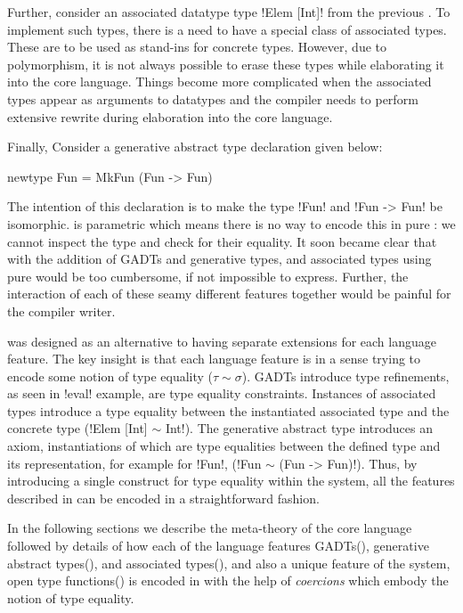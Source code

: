 \documentclass[screen,nonacm]{acmart}
\begin{document}
Further, consider an associated datatype type !Elem [Int]! from the previous . To implement such types, there is a need to have a special class of associated types. These are to be used as stand-ins for concrete types. However, due to polymorphism, it is not always possible to erase these types while elaborating it into the core language. Things become more complicated when the associated types appear as arguments to datatypes and the compiler needs to perform extensive rewrite during elaboration into the core language.

Finally, Consider a generative abstract type declaration given below:

\begin{CenteredBox}
\begin{code}
newtype Fun = MkFun (Fun -> Fun)
\end{code}
\end{CenteredBox}
The intention of this declaration is to make the type !Fun! and !Fun -> Fun! be isomorphic. \SF is parametric which means there is no way to encode this in pure \SF: we cannot inspect the type and check for their equality. It soon became clear that with the addition of GADTs and generative types, and associated types using pure \SF would be too cumbersome, if not impossible to express. Further, the interaction of each of these seamy different features together would be painful for the compiler writer.

\SFC\cite{sulzmann_system_2007} was designed as an alternative to having separate extensions for each language feature. The key insight is that each language feature is in a sense trying to encode some notion of type equality ($\tau\sim\sigma$). GADTs introduce type refinements, as seen in !eval! example, are type equality constraints. Instances of associated types introduce a type equality between the instantiated associated type and the concrete type (!Elem [Int] $\sim$ Int!). The generative abstract type introduces an axiom, instantiations of which are type equalities between the defined type and its representation, for example for !Fun!, (!Fun $\sim$ (Fun -> Fun)!). Thus, by introducing a single construct for type equality within the system, all the features described in  can be encoded in a straightforward fashion.

In the following sections we describe the  meta-theory of the core language followed by details of how each of the language features GADTs(), generative abstract types(), and associated types(), and also a unique feature of the system, open type functions() is encoded in \SFC with the help of \emph{coercions} which embody the notion of type equality.
\end{document}
